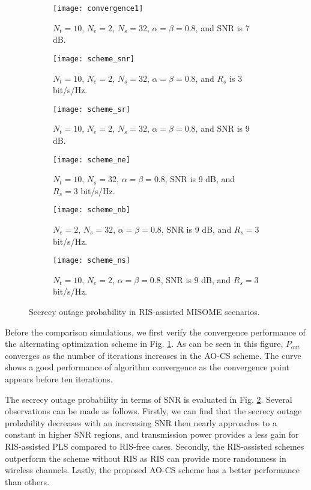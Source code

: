 \documentclass[journal]{IEEEtran}
\theoremstyle{definition}
\begin{document}
\begin{figure*}[h!]
\begin{subfigure}[t]{.32\textwidth}
\centering
\texttt{[image: convergence1]}
\caption{$N_t=10$, $N_e=2$, $N_s=32$, $\alpha=\beta=0.8$, and SNR is 7 dB.}\label{convergence_sim}
\end{subfigure}\hfill
\begin{subfigure}[t]{.32\textwidth}
\centering
\texttt{[image: scheme\_snr]}
\caption{$N_t=10$, $N_e=2$, $N_s=32$, $\alpha=\beta=0.8$, and $R_s$ is 3 bit/s/Hz.}\label{simSNR}
\end{subfigure}
\begin{subfigure}[t]{.32\textwidth}
\centering
\texttt{[image: scheme\_sr]}
\caption{$N_t=10$, $N_e=2$, $N_s=32$, $\alpha=\beta=0.8$, and SNR is 9 dB.}\label{simRs}
\end{subfigure}
\begin{subfigure}[t]{.32\textwidth}
\centering
\texttt{[image: scheme\_ne]}
\caption{$N_t=10$, $N_s=32$, $\alpha=\beta=0.8$, SNR is 9 dB, and $R_s=3$ bit/s/Hz.}\label{simNe}
\end{subfigure}\hfill
\begin{subfigure}[t]{.32\textwidth}
\centering
\texttt{[image: scheme\_nb]}
\caption{$N_e=2$, $N_s=32$, $\alpha=\beta=0.8$, SNR is 9 dB, and $R_s=3$ bit/s/Hz.}\label{simal}
\end{subfigure}
\begin{subfigure}[t]{.32\textwidth}
\centering
\texttt{[image: scheme\_ns]}
\caption{$N_t=10$, $N_e=2$, $\alpha=\beta=0.8$, SNR is 9 dB, and $R_s=3$ bit/s/Hz.}\label{simbe}
\end{subfigure}
\caption{Secrecy outage probability in RIS-assisted MISOME scenarios.}
\end{figure*}

Before the comparison simulations, we first verify the convergence performance of the alternating optimization scheme in Fig. \ref{convergence_sim}. As can be seen in this figure, $P_\text{out}$ converges as the number of iterations increases in the AO-CS scheme. The curve shows a good performance of algorithm convergence as the convergence point appears before ten iterations.

The secrecy outage probability in terms of SNR is evaluated in Fig. \ref{simSNR}. Several observations can be made as follows. Firstly, we can find that the secrecy outage probability decreases with an increasing SNR then nearly approaches to a constant in higher SNR regions, and transmission power provides a less gain for RIS-assisted PLS compared to RIS-free cases. Secondly, the RIS-assisted schemes outperform the scheme without RIS as RIS can provide more randomness in wireless channels. Lastly, the proposed AO-CS scheme has a better performance than others.
\end{document}
